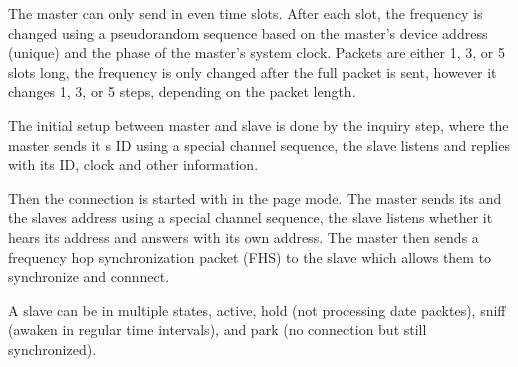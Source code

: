 The master can only send in even time slots. After each slot, the frequency is
changed using a pseudorandom sequence based on the master's device address
(unique) and the phase of the master's system clock. Packets are either 1, 3, or
5 slots long, the frequency is only changed after the full packet is sent,
however it changes 1, 3, or 5 steps, depending on the packet length.

The initial setup between master and slave is done by the inquiry step, where
the master sends it s ID using a special channel sequence, the slave listens and
replies with its ID, clock and other information.

Then the connection is started with in the page mode. The master sends its and
the slaves address using a special channel sequence, the slave listens whether
it hears its address and answers with its own address. The master then sends a
frequency hop synchronization packet (FHS) to the slave which allows them to
synchronize and connnect.

A slave can be in multiple states, active, hold (not processing date packtes),
sniff (awaken in regular time intervals), and park (no connection but still
synchronized).
